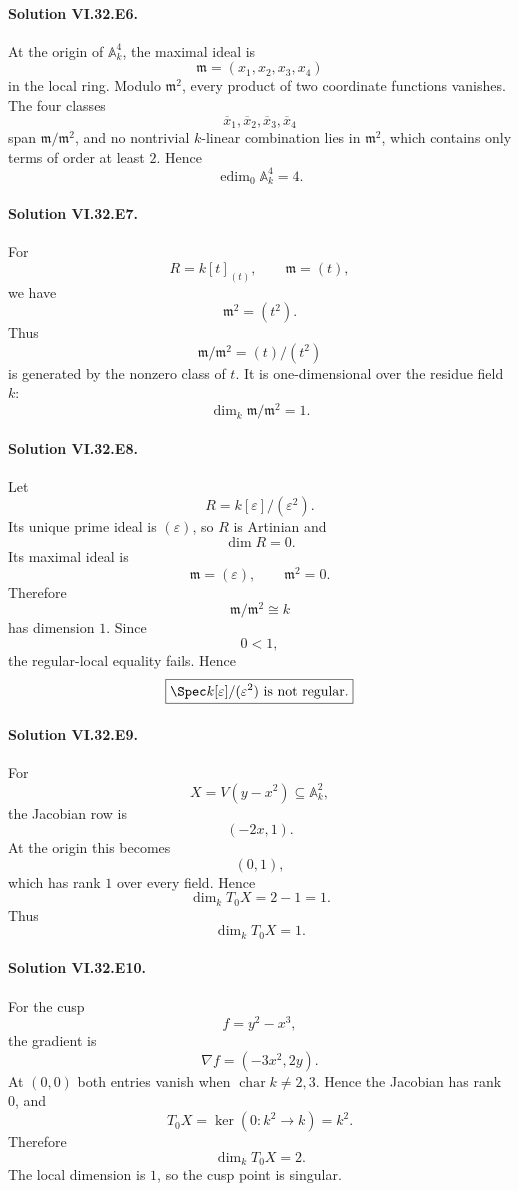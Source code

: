 \paragraph{Solution VI.32.E6.}
At the origin of \(\mathbb A^4_k\), the maximal ideal is
\[
\mathfrak m=(x_1,x_2,x_3,x_4)
\]
in the local ring.  Modulo \(\mathfrak m^2\), every product of two coordinate functions vanishes.  The four classes
\[
\overline{x}_1,\overline{x}_2,\overline{x}_3,\overline{x}_4
\]
span \(\mathfrak m/\mathfrak m^2\), and no nontrivial \(k\)-linear combination lies in \(\mathfrak m^2\), which
contains only terms of order at least \(2\). Hence
\[
\boxed{\operatorname{edim}_0\mathbb A^4_k=4}.
\]

\paragraph{Solution VI.32.E7.}
For
\[
R=k[t]_{(t)},
\qquad
\mathfrak m=(t),
\]
we have
\[
\mathfrak m^2=(t^2).
\]
Thus
\[
\mathfrak m/\mathfrak m^2
=
(t)/(t^2)
\]
is generated by the nonzero class of \(t\).  It is one-dimensional over the residue field \(k\):
\[
\boxed{\dim_k\mathfrak m/\mathfrak m^2=1}.
\]

\paragraph{Solution VI.32.E8.}
Let
\[
R=k[\varepsilon]/(\varepsilon^2).
\]
Its unique prime ideal is \((\varepsilon)\), so \(R\) is Artinian and
\[
\dim R=0.
\]
Its maximal ideal is
\[
\mathfrak m=(\varepsilon),
\qquad
\mathfrak m^2=0.
\]
Therefore
\[
\mathfrak m/\mathfrak m^2\cong k
\]
has dimension \(1\). Since
\[
0<1,
\]
the regular-local equality fails. Hence
\[
\boxed{\Spec k[\varepsilon]/(\varepsilon^2)\text{ is not regular}.}
\]

\paragraph{Solution VI.32.E9.}
For
\[
X=V(y-x^2)\subseteq\mathbb A^2_k,
\]
the Jacobian row is
\[
(-2x,1).
\]
At the origin this becomes
\[
(0,1),
\]
which has rank \(1\) over every field.  Hence
\[
\dim_kT_0X=2-1=1.
\]
Thus
\[
\boxed{\dim_kT_0X=1}.
\]

\paragraph{Solution VI.32.E10.}
For the cusp
\[
f=y^2-x^3,
\]
the gradient is
\[
\nabla f=(-3x^2,2y).
\]
At \((0,0)\) both entries vanish when \(\operatorname{char}k\ne2,3\).  Hence the Jacobian has rank \(0\), and
\[
T_0X=\ker(0:k^2\to k)=k^2.
\]
Therefore
\[
\boxed{\dim_kT_0X=2}.
\]
The local dimension is \(1\), so the cusp point is singular.

